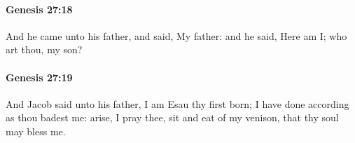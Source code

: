 		\paragraph{Genesis 27:18} %
			\label{GENESIS-27-18}

			And he came unto his father, and said, My father: and he said, Here am I; who art thou, my son?


		\paragraph{Genesis 27:19} %
			\label{GENESIS-27-19}

			And Jacob said unto his father, I am Esau thy first born; I have done according as thou badest me: arise, I pray thee, sit and eat of my venison, that thy soul may bless me.


